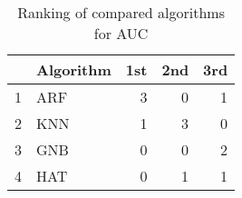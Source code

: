 \begin{table}
\footnotesize
\caption{Ranking of compared algorithms for AUC}
\label{tab:places AUC}
\begin{tabular}{llrrr}
\hline
 & Algorithm & 1st & 2nd & 3rd \\
\hline
1 & ARF & 3 & 0 & 1 \\
2 & KNN & 1 & 3 & 0 \\
3 & GNB & 0 & 0 & 2 \\
4 & HAT & 0 & 1 & 1 \\
\hline
\end{tabular}
\end{table}
